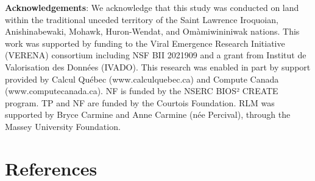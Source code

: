 \documentclass[10pt,oneside]{article}
\begin{document}
\textbf{Acknowledgements}: We acknowledge that this study was conducted
on land within the traditional unceded territory of the Saint Lawrence
Iroquoian, Anishinabewaki, Mohawk, Huron-Wendat, and Omàmiwininiwak
nations. This work was supported by funding to the Viral Emergence
Research Initiative (VERENA) consortium including NSF BII 2021909 and a
grant from Institut de Valorisation des Données (IVADO). This research
was enabled in part by support provided by Calcul Québec
(www.calculquebec.ca) and Compute Canada (www.computecanada.ca). NF is
funded by the NSERC BIOS² CREATE program. TP and NF are funded by the
Courtois Foundation. RLM was supported by Bryce Carmine and Anne Carmine
(née Percival), through the Massey University Foundation.

\hypertarget{references}{%
\section*{References}\label{references}}
\end{document}
